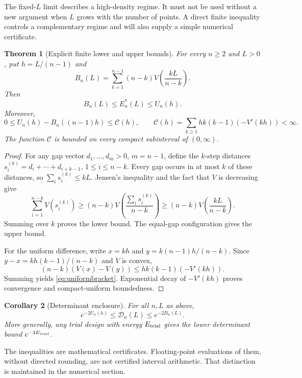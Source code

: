 \documentclass[11pt,a4paper]{article}
\newtheorem{theorem}{Theorem}[section]
\newtheorem{corollary}[theorem]{Corollary}
\theoremstyle{definition}
\theoremstyle{remark}
\newcommand{\Dopt}{\mathcal D}
\newcommand{\cC}{\mathcal C}
\begin{document}
The fixed-$L$ limit describes a high-density regime. It must not be used
without a new argument when $L$ grows with the number of points. A direct
finite inequality controls a complementary regime and will also supply a
simple numerical certificate.

\begin{theorem}[Explicit finite lower and upper bounds]
\label{thm:bounds}
For every $n\ge2$ and $L>0$, put $h=L/(n-1)$ and
\begin{equation}
 B_n(L)=\sum_{k=1}^{n-1}(n-k)
 V\!\left(\frac{kL}{n-k}\right).
 \label{eq:lowerbound}
\end{equation}
Then
\begin{equation}
 B_n(L)\le E_n^*(L)\le U_n(h).
 \label{eq:bracket}
\end{equation}
Moreover,
\begin{equation}
 0\le U_n(h)-B_n((n-1)h)\le\cC(h),\qquad
 \cC(h)=\sum_{k\ge1}hk(k-1)(-V'(kh))<\infty.
 \label{eq:uniformbracket}
\end{equation}
The function $\cC$ is bounded on every compact subinterval of $(0,\infty)$.
\end{theorem}
\begin{proof}
For any gap vector $d_1,\ldots,d_m>0$, $m=n-1$, define the $k$-step distances
$s_i^{(k)}=d_i+\cdots+d_{i+k-1}$, $1\le i\le n-k$.
Every gap occurs in at most $k$ of these distances, so
$\sum_i s_i^{(k)}\le kL$. Jensen's inequality and the fact that $V$ is
decreasing give
\[
 \sum_{i=1}^{n-k}V(s_i^{(k)})
 \ge(n-k)V\!\left(\frac{\sum_i s_i^{(k)}}{n-k}\right)
 \ge(n-k)V\!\left(\frac{kL}{n-k}\right).
\]
Summing over $k$ proves the lower bound. The equal-gap configuration gives
the upper bound.

For the uniform difference, write $x=kh$ and
$y=k(n-1)h/(n-k)$. Since $y-x=kh(k-1)/(n-k)$ and $V$ is convex,
\[
 (n-k)(V(x)-V(y))\le hk(k-1)(-V'(kh)).
\]
Summing yields \eqref{eq:uniformbracket}. Exponential decay of $-V'(kh)$
proves convergence and compact-uniform boundedness.
\end{proof}

\begin{corollary}[Determinant enclosure]
\label{cor:detbounds}
For all $n,L$ as above,
\begin{equation}
 e^{-2U_n(h)}\le\Dopt_n(L)\le e^{-2B_n(L)}.
 \label{eq:detbracket}
\end{equation}
More generally, any trial design with energy $E_{\rm trial}$ gives the
lower determinant bound $e^{-2E_{\rm trial}}$.
\end{corollary}
The inequalities are mathematical certificates. Floating-point evaluations
of them, without directed rounding, are not certified interval arithmetic.
That distinction is maintained in the numerical section.
\end{document}

